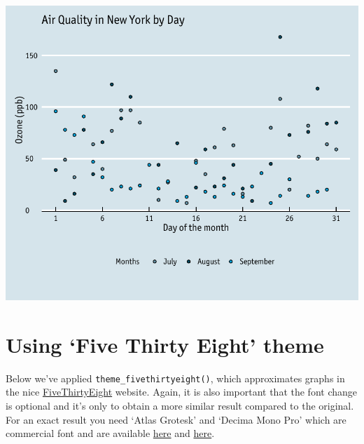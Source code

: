 \documentclass[]{article}
\begin{document}
\begin{center}\includegraphics{5_Scatter_Plots_pdf/scatter_14-1} \end{center}

\section{\texorpdfstring{Using `Five Thirty Eight'
theme}{Using Five Thirty Eight theme}}\label{using-five-thirty-eight-theme}

Below we've applied \texttt{theme\_fivethirtyeight()}, which
approximates graphs in the nice
\href{http://fivethirtyeight.com/}{FiveThirtyEight} website. Again, it
is also important that the font change is optional and it's only to
obtain a more similar result compared to the original. For an exact
result you need `Atlas Grotesk' and `Decima Mono Pro' which are
commercial font and are available
\href{https://commercialtype.com/catalog/atlas}{here} and
\href{https://www.myfonts.com/fonts/tipografiaramis/decima-mono-pro/}{here}.
\end{document}
